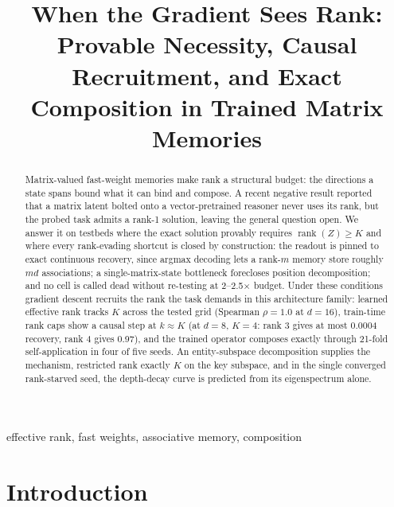 \documentclass[mlabstract,onecolumn]{jmlr}
\title[When the Gradient Sees Rank]{When the Gradient Sees Rank: Provable
Necessity, Causal Recruitment, and Exact Composition in Trained Matrix
Memories}
\newcommand{\rank}{\operatorname{rank}}
\begin{document}
\maketitle

\begin{abstract}
Matrix-valued fast-weight memories make rank a structural budget: the
directions a state spans bound what it can bind and compose. A recent
negative result reported that a matrix latent bolted onto a
vector-pretrained reasoner never uses its rank, but the probed task admits
a rank-1 solution, leaving the general question open. We answer it on
testbeds where the exact solution provably requires
$\rank(Z) \geq K$ and where every rank-evading shortcut is closed by
construction: the readout is pinned to exact continuous recovery, since
argmax decoding lets a rank-$m$ memory store roughly $md$ associations; a
single-matrix-state bottleneck forecloses position decomposition; and no
cell is called dead without re-testing at 2--2.5$\times$ budget. Under
these conditions gradient descent recruits the rank the task demands in
this architecture family:
learned effective rank tracks $K$ across the tested grid (Spearman
$\rho = 1.0$ at $d = 16$),
train-time rank caps show a causal step at $k \approx K$ (at $d = 8$,
$K = 4$: rank 3 gives at most 0.0004 recovery, rank 4 gives 0.97),
and the trained operator composes exactly through 21-fold self-application
in four of five seeds.
An entity-subspace decomposition supplies the mechanism, restricted rank
exactly $K$ on the key subspace,
and in the single converged rank-starved seed, the depth-decay curve is
predicted from its eigenspectrum alone.
\end{abstract}

\begin{keywords}
effective rank, fast weights, associative memory, composition
\end{keywords}

\section{Introduction}
\label{sec:intro}
\end{document}
